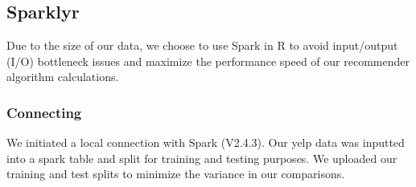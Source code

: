 \documentclass[]{article}
\begin{document}
\hypertarget{sparklyr}{%
\subsection{Sparklyr}\label{sparklyr}}

Due to the size of our data, we choose to use Spark in R to avoid
input/output (I/O) bottleneck issues and maximize the performance speed
of our recommender algorithm calculations.

\hypertarget{connecting}{%
\subsubsection{Connecting}\label{connecting}}

We initiated a local connection with Spark (V2.4.3). Our yelp data was
inputted into a spark table and split for training and testing purposes.
We uploaded our training and test splits to minimize the variance in our
comparisons.
\end{document}
